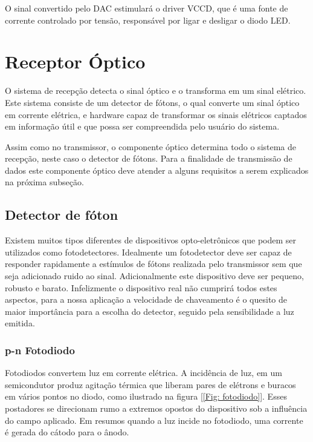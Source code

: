 O sinal convertido pelo DAC estimulará o driver VCCD, que é uma fonte de corrente controlado por tensão, responsável por ligar e desligar o diodo LED.

\section{Receptor Óptico}

O sistema de recepção detecta o sinal óptico e o transforma em um sinal elétrico. Este sistema consiste de um detector de fótons, o qual converte um sinal óptico em corrente elétrica, e hardware capaz de transformar os sinais elétricos captados em informação útil e que possa ser compreendida pelo usuário do sistema.

Assim como no transmissor, o componente óptico determina todo o sistema de recepção, neste caso o detector de fótons. Para a finalidade de transmissão de dados este componente óptico deve atender a alguns requisitos a serem explicados na próxima subseção.

\subsection{Detector de fóton}

Existem muitos tipos diferentes de dispositivos opto-eletrônicos que podem ser utilizados como fotodetectores. Idealmente um fotodetector deve ser capaz de responder rapidamente a estímulos de fótons realizada pelo transmissor sem que seja adicionado ruido ao sinal. Adicionalmente este dispositivo deve ser pequeno, robusto e barato. Infelizmente o dispositivo real não cumprirá todos estes aspectos, para a nossa aplicação a velocidade de chaveamento é o quesito de maior importância para a escolha do detector, seguido pela sensibilidade a luz emitida. 

\subsubsection{p-n Fotodiodo}

Fotodiodos convertem luz em corrente elétrica. A incidência de luz, em um semicondutor produz agitação térmica que liberam pares de elétrons e buracos em vários pontos no diodo, como ilustrado na figura [\ref{Fig: fotodiodo}]. Esses postadores se direcionam rumo a extremos opostos do dispositivo sob a influência do campo aplicado. Em resumos quando a luz incide no fotodiodo, uma corrente é gerada do cátodo para o ânodo. \cite{Razavi}

